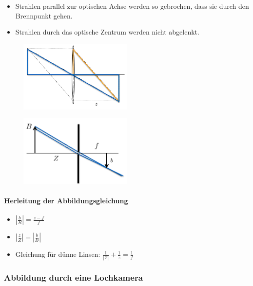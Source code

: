 \documentclass[12pt, a4paper, oneside]{article}
\begin{document}
\begin{itemize}
    \item Strahlen parallel zur optischen Achse werden so gebrochen, dass sie durch den Brennpunkt gehen.
    \item Strahlen durch das optische Zentrum werden nicht abgelenkt.
\end{itemize}

\begin{figure}[!h]
    \centering
    \includegraphics[width=0.5\textwidth]{../img/2-1.png}
    \label{img/2-1}
\end{figure}

\begin{figure}[!h]
    \centering
    \includegraphics[width=0.5\textwidth]{../img/2-2.png}
    \label{img/2-2}
\end{figure}

\paragraph*{Herleitung der Abbildungsgleichung}

\begin{itemize}
    \item $|\frac{b}{B}| = \frac{z-f}{f}$
    \item $|\frac{z}{Z}| = |\frac{b}{B}|$
    \item Gleichung für dünne Linsen: $\frac{1}{|Z|} + \frac{1}{z} = \frac{1}{f}$
\end{itemize}

\subsubsection{Abbildung durch eine Lochkamera}
\end{document}
